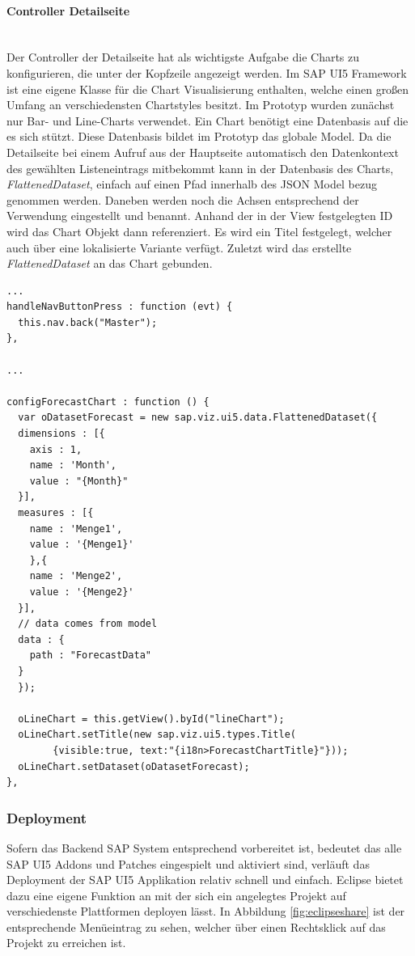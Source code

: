 \paragraph{Controller Detailseite}$\;$ \\
Der Controller der Detailseite hat als wichtigste Aufgabe die Charts zu konfigurieren, die unter der Kopfzeile angezeigt werden. Im SAP UI5 Framework ist eine eigene Klasse für die Chart Visualisierung enthalten, welche einen großen Umfang an verschiedensten Chartstyles besitzt. Im Prototyp wurden zunächst nur Bar- und Line-Charts verwendet. Ein Chart benötigt eine Datenbasis auf die es sich stützt. Diese Datenbasis bildet im Prototyp das globale Model. Da die Detailseite bei einem Aufruf aus der Hauptseite automatisch den Datenkontext des gewählten Listeneintrags mitbekommt kann in der Datenbasis des Charts, \textit{FlattenedDataset}, einfach auf einen Pfad innerhalb des JSON Model bezug genommen werden. Daneben werden noch die Achsen entsprechend der Verwendung eingestellt und benannt. Anhand der in der View festgelegten ID wird das Chart Objekt dann referenziert. Es wird ein Titel festgelegt, welcher auch über eine lokalisierte Variante verfügt. Zuletzt wird das erstellte \textit{FlattenedDataset} an das Chart gebunden.

\vspace{1em}
\begin{lstlisting}[frame=htrbl, caption=Chart Konfigurierung, label=lst:chartconfig]
...
handleNavButtonPress : function (evt) {
  this.nav.back("Master");
},

...
	
configForecastChart : function () {
  var oDatasetForecast = new sap.viz.ui5.data.FlattenedDataset({
  dimensions : [{
    axis : 1,
    name : 'Month',
    value : "{Month}"
  }],
  measures : [{
    name : 'Menge1',
    value : '{Menge1}'
    },{
    name : 'Menge2',
    value : '{Menge2}'
  }],		
  // data comes from model
  data : {
    path : "ForecastData"
  }
  });

  oLineChart = this.getView().byId("lineChart");
  oLineChart.setTitle(new sap.viz.ui5.types.Title(
        {visible:true, text:"{i18n>ForecastChartTitle}"}));
  oLineChart.setDataset(oDatasetForecast);
},
\end{lstlisting}

\subsubsection{Deployment}
Sofern das Backend SAP System entsprechend vorbereitet ist, bedeutet das alle SAP UI5 Addons und Patches eingespielt und aktiviert sind, verläuft das Deployment der SAP UI5 Applikation relativ schnell und einfach. Eclipse bietet dazu eine eigene Funktion an mit der sich ein angelegtes Projekt auf verschiedenste Plattformen deployen lässt. In Abbildung \ref{fig:eclipseshare} ist der entsprechende Menüeintrag zu sehen, welcher über einen Rechtsklick auf das Projekt zu erreichen ist.

